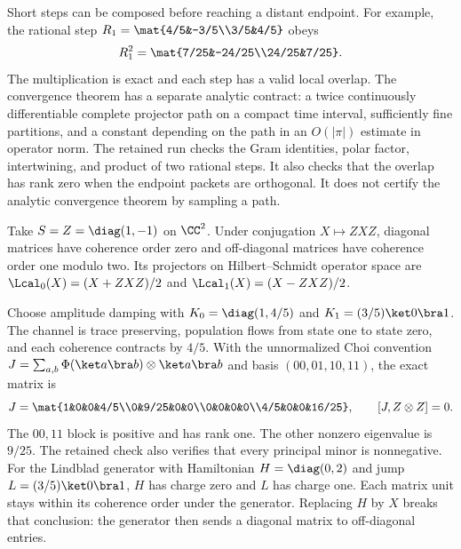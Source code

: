 Short steps can be composed before reaching a distant endpoint. For example, the rational step $R_1=\mat{4/5&-3/5\\3/5&4/5}$ obeys
\[
R_1^2=\mat{7/25&-24/25\\24/25&7/25}.
\]
The multiplication is exact and each step has a valid local overlap. The convergence theorem has a separate analytic contract: a twice continuously differentiable complete projector path on a compact time interval, sufficiently fine partitions, and a constant depending on the path in an $O(|\pi|)$ estimate in operator norm.
The retained run checks the Gram identities, polar factor, intertwining, and product of two rational steps. It also checks that the overlap has rank zero when the endpoint packets are orthogonal. It does not certify the analytic convergence theorem by sampling a path.

Take $S=Z=\diag(1,-1)$ on $\CC^2$. Under conjugation $X\mapsto ZXZ$, diagonal matrices have coherence order zero and off-diagonal matrices have coherence order one modulo two. Its projectors on Hilbert--Schmidt operator space are $\Lcal_0(X)=(X+ZXZ)/2$ and $\Lcal_1(X)=(X-ZXZ)/2$.

Choose amplitude damping with $K_0=\diag(1,4/5)$ and $K_1=(3/5)\ket0\bra1$. The channel is trace preserving, population flows from state one to state zero, and each coherence contracts by $4/5$.
With the unnormalized Choi convention $J=\sum_{a,b}\Phi(\ket a\bra b)\otimes\ket a\bra b$ and basis $(00,01,10,11)$, the exact matrix is
\[
J=\mat{1&0&0&4/5\\0&9/25&0&0\\0&0&0&0\\4/5&0&0&16/25},
\qquad [J,Z\otimes Z]=0.
\]
The $00,11$ block is positive and has rank one. The other nonzero eigenvalue is $9/25$. The retained check also verifies that every principal minor is nonnegative.
For the Lindblad generator with Hamiltonian $H=\diag(0,2)$ and jump $L=(3/5)\ket0\bra1$, $H$ has charge zero and $L$ has charge one. Each matrix unit stays within its coherence order under the generator. Replacing $H$ by $X$ breaks that conclusion: the generator then sends a diagonal matrix to off-diagonal entries.

